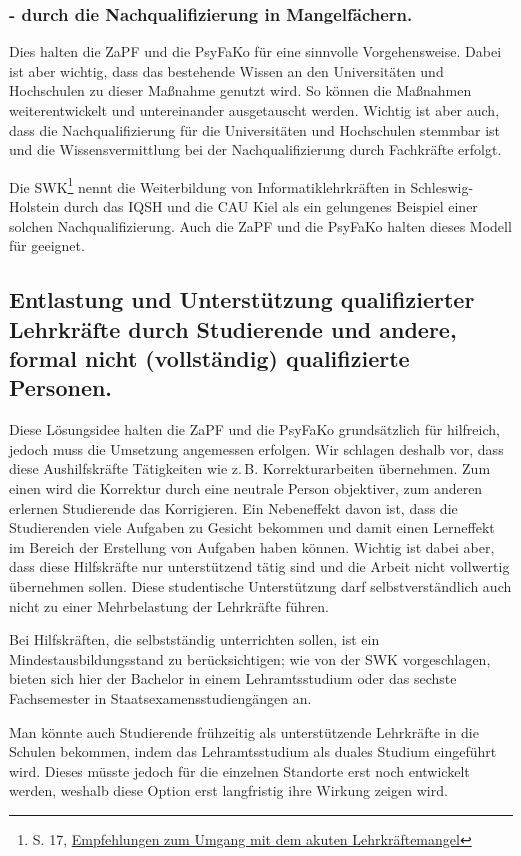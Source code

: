 \documentclass[DIV=calc]{scrartcl}
\begin{document}
\subsubsection*{- durch die Nachqualifizierung in Mangelfächern.}
Dies halten die ZaPF und die PsyFaKo für eine sinnvolle Vorgehensweise. Dabei ist aber wichtig, dass das bestehende Wissen an den Universitäten und Hochschulen zu dieser Maßnahme genutzt wird. So können die Maßnahmen weiterentwickelt und untereinander ausgetauscht werden.
Wichtig ist aber auch, dass die Nachqualifizierung für die Universitäten und Hochschulen stemmbar ist und die Wissensvermittlung bei der Nachqualifizierung durch Fachkräfte erfolgt. 

Die SWK\footnote{S. 17, \href{https://www.kmk.org/fileadmin/Dateien/pdf/KMK/SWK/2023/SWK-2023-Stellungnahme_Lehrkraeftemangel.pdf}{Empfehlungen zum Umgang mit dem akuten Lehrkräftemangel}} nennt die Weiterbildung von Informatiklehrkräften in Schleswig-Holstein durch das IQSH und die CAU Kiel als ein gelungenes Beispiel einer solchen Nachqualifizierung. Auch die ZaPF und die PsyFaKo  halten dieses Modell für geeignet.

\subsection*{Entlastung und Unterstützung qualifizierter Lehrkräfte durch Studierende und andere, formal nicht (vollständig) qualifizierte Personen.}
Diese Lösungsidee halten die ZaPF und die PsyFaKo grundsätzlich für hilfreich, jedoch muss die Umsetzung angemessen erfolgen. Wir schlagen deshalb vor, dass diese Aushilfskräfte Tätigkeiten wie z.\,B. Korrekturarbeiten übernehmen. 
Zum einen wird die Korrektur durch eine neutrale Person objektiver, zum anderen erlernen Studierende das Korrigieren. 
Ein Nebeneffekt davon ist, dass die Studierenden viele Aufgaben zu Gesicht bekommen und damit einen Lerneffekt im Bereich der Erstellung von Aufgaben haben können.
Wichtig ist dabei aber, dass diese Hilfskräfte nur unterstützend tätig sind und die Arbeit nicht vollwertig übernehmen sollen. Diese studentische Unterstützung darf selbstverständlich auch nicht zu einer Mehrbelastung der Lehrkräfte führen.

Bei Hilfskräften, die selbstständig unterrichten sollen, ist ein Mindestausbildungsstand zu berücksichtigen; wie von der SWK vorgeschlagen, bieten sich hier der Bachelor in einem Lehramtsstudium oder das sechste Fachsemester in Staatsexamensstudiengängen an.

Man könnte auch Studierende frühzeitig als unterstützende Lehrkräfte in die Schulen bekommen, indem das Lehramtsstudium als duales Studium eingeführt wird. Dieses müsste jedoch für die einzelnen Standorte erst noch entwickelt werden, weshalb diese Option erst langfristig ihre Wirkung zeigen wird.
\end{document}
